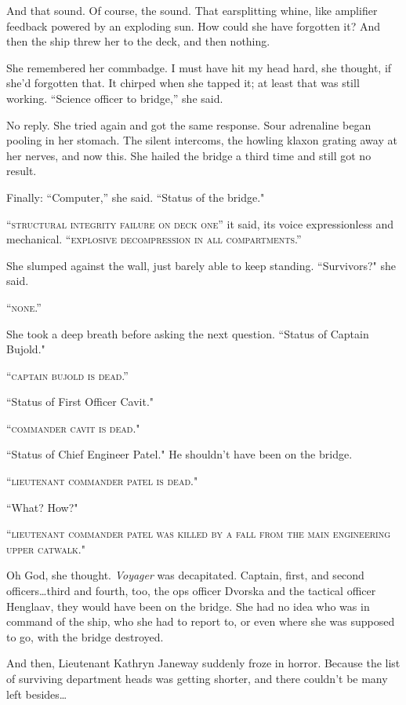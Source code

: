 \documentclass[twoside,letterpaper,12pt]{memoir}
\begin{document}
And that sound. Of course, the sound. That earsplitting whine, like amplifier feedback powered by an exploding sun. How could she have forgotten it? And then the ship threw her to the deck, and then nothing.

She remembered her commbadge. I must have hit my head hard, she thought, if she'd forgotten that. It chirped when she tapped it; at least that was still working. ``Science officer to bridge,'' she said.

No reply. She tried again and got the same response. Sour adrenaline began pooling in her stomach. The silent intercoms, the howling klaxon grating away at her nerves, and now this. She hailed the bridge a third time and still got no result.

Finally: ``Computer,'' she said. ``Status of the bridge."

``\textsc{structural integrity failure on deck one}'' it said, its voice expressionless and mechanical. ``\textsc{explosive decompression in all compartments}.''

She slumped against the wall, just barely able to keep standing. ``Survivors?" she said.

``\textsc{none}.''

She took a deep breath before asking the next question. ``Status of Captain Bujold."

``\textsc{captain bujold is dead}.''

``Status of First Officer Cavit."

``\textsc{commander cavit is dead}."

``Status of Chief Engineer Patel." He shouldn't have been on the bridge.

``\textsc{lieutenant commander patel is dead}."

``What? How?"

``\textsc{lieutenant commander patel was killed by a fall from the main engineering upper catwalk}."

Oh God, she thought. \textit{Voyager} was decapitated. Captain, first, and second officers…third and fourth, too, the ops officer Dvorska and the tactical officer Henglaav, they would have been on the bridge. She had no idea who was in command of the ship, who she had to report to, or even where she was supposed to go, with the bridge destroyed.

And then, Lieutenant Kathryn Janeway suddenly froze in horror. Because the list of surviving department heads was getting shorter, and there couldn't be many left besides\ldots
\end{document}
